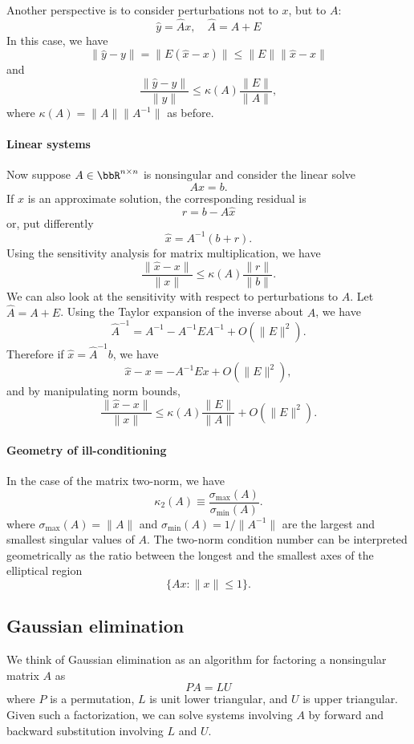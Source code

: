 \documentclass[12pt, leqno]{article}
\begin{document}
Another perspective is to consider perturbations not to $x$, but to
$A$:
\[
  \hat{y} = \hat{A} x, \quad \hat{A} = A + E
\]
In this case, we have
\[
  \|\hat{y}-y\| = \|E(\hat{x}-x)\| \leq \|E\| \|\hat{x}-x\| 
\]
and
\[
  \frac{\|\hat{y}-y\|}{\|y\|} \leq
  \kappa(A) \frac{\|E\|}{\|A\|},
\]
where $\kappa(A) = \|A\| \|A^{-1}\|$ as before.

\paragraph{Linear systems}
Now suppose $A \in \bbR^{n \times n}$ is nonsingular and consider the
linear solve
\[
  Ax = b.
\]
If $\hat{x}$ is an approximate solution, the corresponding residual is
\[
  r = b-A\hat{x}
\]
or, put differently
\[
  \hat{x} = A^{-1} (b + r).
\]
Using the sensitivity analysis for matrix multiplication, we have
\[
  \frac{\|\hat{x}-x\|}{\|x\|} \leq \kappa(A) \frac{\|r\|}{\|b\|}.
\]
We can also look at the sensitivity with respect to perturbations
to $A$.  Let $\hat{A} = A + E$.  Using the Taylor expansion of the
inverse about $A$, we have
\[
  \hat{A}^{-1} = A^{-1} - A^{-1} E A^{-1} + O(\|E\|^2).
\]
Therefore if $\hat{x} = \hat{A}^{-1} b$, we have
\[
  \hat{x}-x = -A^{-1} E x + O(\|E\|^2),
\]
and by manipulating norm bounds,
\[
  \frac{\|\hat{x}-x\|}{\|x\|}
  \leq \kappa(A) \frac{\|E\|}{\|A\|} + O(\|E\|^2).
\]

\paragraph{Geometry of ill-conditioning}
In the case of the matrix two-norm, we have
\[
  \kappa_2(A) \equiv \frac{\sigma_{\max}(A)}{\sigma_{\min}(A)}.
\]
where $\sigma_{\max}(A) = \|A\|$ and $\sigma_{\min}(A) = 1/\|A^{-1}\|$
are the largest and smallest singular values of $A$.
The two-norm condition number can be interpreted geometrically as the
ratio between the longest and the smallest axes of the elliptical region
\[
  \{Ax : \|x\| \leq 1\}.
\]

\subsection{Gaussian elimination}

We think of Gaussian elimination as an algorithm for factoring a
nonsingular matrix $A$ as
\[
  PA = LU
\]
where $P$ is a permutation, $L$ is unit lower triangular, and $U$ is
upper triangular.  Given such a factorization, we can solve systems
involving $A$ by forward and backward substitution involving $L$
and $U$.
\end{document}
